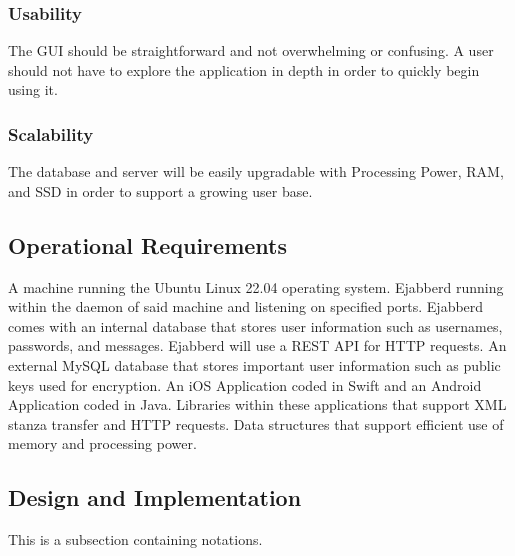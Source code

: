 \documentclass[11pt]{article}
\theoremstyle{plain}
\theoremstyle{definition}
\begin{document}
\subsubsection{Usability}
The GUI should be straightforward and not overwhelming or confusing. A user should not have to explore the application in depth in order to quickly begin using it.
\subsubsection{Scalability}
The database and server will be easily upgradable with Processing Power, RAM, and SSD in order to support a growing user base. 

\subsection{Operational Requirements}\label{sec:operationalrequirements}
A machine running the Ubuntu Linux 22.04 operating system. Ejabberd running within the daemon of said machine and listening on specified ports. Ejabberd comes with an internal database that stores user information such as usernames, passwords, and messages. Ejabberd will use a REST API for HTTP requests. An external MySQL database that stores important user information such as public keys used for encryption. An iOS Application coded in Swift and an Android Application coded in Java. Libraries within these applications that support XML stanza transfer and HTTP requests. Data structures that support efficient use of memory and processing power.

\subsection{Design and Implementation}\label{sec:designandimplementationrequirements}
This is a subsection containing notations.
\end{document}
